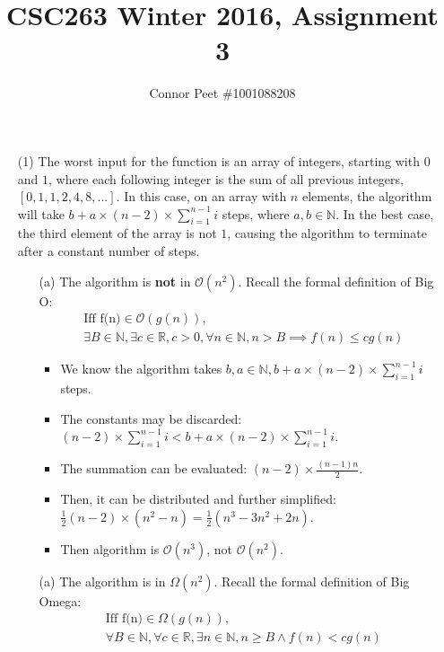 \documentclass{article}
\title{CSC263 Winter 2016, Assignment 3}
\author{Connor Peet \#1001088208}
\begin{document}
\maketitle

\begin{enumerate}
\item [(1)] The worst input for the function is an array of integers, starting with $0$ and $1$, where each following integer is the sum of all previous integers, $[0, 1, 1, 2, 4, 8, ...]$. In this case, on an array with $n$ elements, the algorithm will take $b + a \times (n - 2) \times \sum_{i = 1}^{n - 1} i$ steps, where $a, b \in \mathbb{N}$. In the best case, the third element of the array is not $1$, causing the algorithm to terminate after a constant number of steps.
    \begin{enumerate}
    \item [(a)] The algorithm is \textbf{not} in $\mathcal{O}(n^2)$. Recall the formal definition of Big O:
        \begin{gather*}
            \text{Iff f(n)} \in \mathcal{O}(g(n)), \\
            \exists B \in \mathbb{N}, \exists c \in \mathbb{R}, c > 0, \forall n \in \mathbb{N}, n > B \implies f(n) \leq cg(n)
        \end{gather*}
        \begin{itemize}
        \item We know the algorithm takes $b, a \in \mathbb{N}, b + a \times (n - 2) \times \sum_{i = 1}^{n - 1} i$ steps.
        \item The constants may be discarded: $(n - 2) \times \sum_{i = 1}^{n - 1} i < b + a \times (n - 2) \times \sum_{i = 1}^{n - 1} i$.
        \item The summation can be evaluated: $(n - 2) \times \frac{(n - 1) n}{2}$.
        \item Then, it can be distributed and further simplified: $\frac{1}{2} (n - 2) \times (n^2 - n) = \frac{1}{2} (n^3 - 3n^2 + 2n)$.
        \item Then algorithm is $\mathcal O(n^3)$, not $\mathcal O(n^2)$.
        \end{itemize}
    \end{enumerate}
    \begin{enumerate}
    \item [(a)] The algorithm is in $\Omega(n^2)$. Recall the formal definition of Big Omega:
        \begin{gather*}
            \text{Iff f(n)} \in \Omega(g(n)), \\
            \forall B \in \mathbb{N}, \forall c \in \mathbb{R}, \exists n \in \mathbb{N}, n \geq B \land f(n) < cg(n)
        \end{gather*}
    \end{enumerate}
\end{enumerate}
\end{document}
